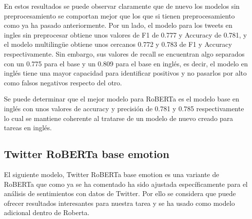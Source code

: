 En estos resultados se puede observar claramente que de nuevo los modelos sin preprocesamiento se comportan mejor que los que si tienen preprocesamiento como ya ha pasado anteriormente. Por un lado, el modelo para los tweets en ingles sin preprocesar obtiene unos valores de F1 de 0.777 y Accuracy de 0.781, y el modelo multilingüe obtiene unos cercanos 0.772 y 0.783 de F1 y Accuracy respectivamente. Sin embargo, sus valores de recall se encuentran algo separados con un 0.775 para el base y un 0.809 para el base en inglés, es decir, el modelo en inglés tiene una mayor capacidad para identificar positivos y no pasarlos por alto como falsos negativos respecto del otro.

Se puede determinar que el mejor modelo para RoBERTa es el modelo base en inglés con unos valores de accuracy y precisión de 0.781 y 0.785 respectivamente lo cual se mantiene coherente al tratarse de un modelo de nuevo creado para tareas en inglés.

\subsection{Twitter RoBERTa base emotion}
El siguiente modelo, Twitter RoBERTa base emotion \cite{twitter-roberta-base-emotion} es una variante de RoBERTa que como ya se ha comentado ha sido ajustada específicamente para el análisis de sentimientos con datos de Twitter. Por ello se considera que puede ofrecer resultados interesantes para nuestra tarea y se ha usado como modelo adicional dentro de Roberta.

